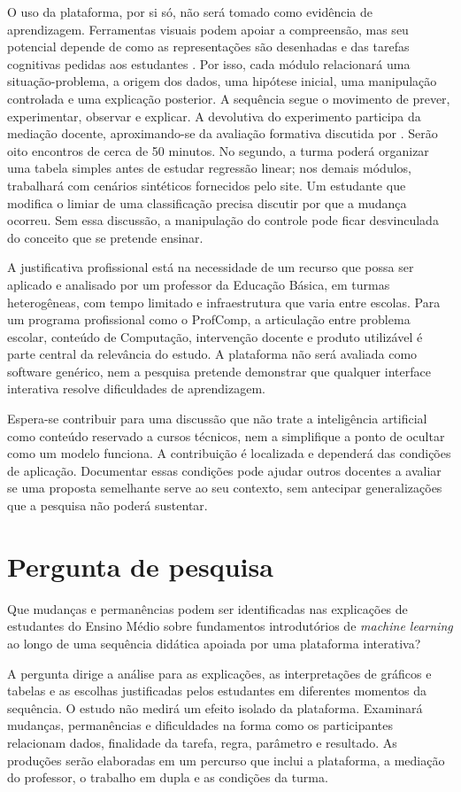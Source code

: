 O uso da plataforma, por si só, não será tomado como evidência de aprendizagem. Ferramentas visuais podem apoiar a compreensão, mas seu potencial depende de como as representações são desenhadas e das tarefas cognitivas pedidas aos estudantes \cite{ainsworth2006deft}. Por isso, cada módulo relacionará uma situação-problema, a origem dos dados, uma hipótese inicial, uma manipulação controlada e uma explicação posterior. A sequência segue o movimento de prever, experimentar, observar e explicar. A devolutiva do experimento participa da mediação docente, aproximando-se da avaliação formativa discutida por . Serão oito encontros de cerca de 50 minutos. No segundo, a turma poderá organizar uma tabela simples antes de estudar regressão linear; nos demais módulos, trabalhará com cenários sintéticos fornecidos pelo site. Um estudante que modifica o limiar de uma classificação precisa discutir por que a mudança ocorreu. Sem essa discussão, a manipulação do controle pode ficar desvinculada do conceito que se pretende ensinar.

A justificativa profissional está na necessidade de um recurso que possa ser aplicado e analisado por um professor da Educação Básica, em turmas heterogêneas, com tempo limitado e infraestrutura que varia entre escolas. Para um programa profissional como o ProfComp, a articulação entre problema escolar, conteúdo de Computação, intervenção docente e produto utilizável é parte central da relevância do estudo. A plataforma não será avaliada como software genérico, nem a pesquisa pretende demonstrar que qualquer interface interativa resolve dificuldades de aprendizagem.

Espera-se contribuir para uma discussão que não trate a inteligência artificial como conteúdo reservado a cursos técnicos, nem a simplifique a ponto de ocultar como um modelo funciona. A contribuição é localizada e dependerá das condições de aplicação. Documentar essas condições pode ajudar outros docentes a avaliar se uma proposta semelhante serve ao seu contexto, sem antecipar generalizações que a pesquisa não poderá sustentar.

\section{Pergunta de pesquisa}

Que mudanças e permanências podem ser identificadas nas explicações de estudantes do Ensino Médio sobre fundamentos introdutórios de \textit{machine learning} ao longo de uma sequência didática apoiada por uma plataforma interativa?

A pergunta dirige a análise para as explicações, as interpretações de gráficos e tabelas e as escolhas justificadas pelos estudantes em diferentes momentos da sequência. O estudo não medirá um efeito isolado da plataforma. Examinará mudanças, permanências e dificuldades na forma como os participantes relacionam dados, finalidade da tarefa, regra, parâmetro e resultado. As produções serão elaboradas em um percurso que inclui a plataforma, a mediação do professor, o trabalho em dupla e as condições da turma.
